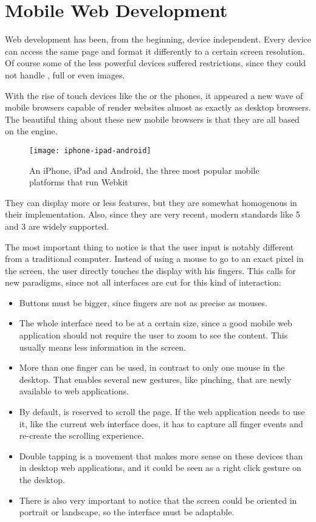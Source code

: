 \section{Mobile Web Development} %
\label{sec:mobile}

Web development has been, from the beginning, device independent.
Every device can access the same page and format it differently to a certain screen resolution.
Of course some of the less powerful devices suffered restrictions, since they could not handle , full  or even images.

With the rise of touch devices like the  or the  phones, it appeared a new wave of mobile browsers capable of render websites almost as exactly as desktop browsers.
The beautiful thing about these new mobile browsers is that they are all based on the  engine.

\begin{figure}[htbp]
  \centering
    \texttt{[image: iphone-ipad-android]}
  \caption[Mobile devices with Webkit]{An iPhone, iPad and Android, the three most popular mobile platforms that run Webkit}
  \label{fig:iphone-ipad-android}
\end{figure}

They can display more or less features, but they are somewhat homogenous in their implementation.
Also, since they are very recent, modern standards like 5 and 3 are widely supported.

The most important thing to notice is that the user input is notably different from a traditional computer.
Instead of using a mouse to go to an exact pixel in the screen, the user directly touches the display with his fingers.
This calls for new paradigms, since not all interfaces are cut for this kind of interaction:

\begin{itemize}
  \item Buttons must be bigger, since fingers are not as precise as mouses.
  \item The whole interface need to be at a certain size, since a good mobile web application should not require the user to zoom to see the content.
  This usually means less information in the screen.
  \item More than one finger can be used, in contrast to only one mouse in the desktop.
  That enables several new gestures, like pinching, that are newly available to web applications.
  \item By default,  is reserved to scroll the page.
  If the web application needs to use it, like the current web interface does, it has to capture all finger events and re-create the scrolling experience.
  \item Double tapping is a movement that makes more sense on these devices than in desktop web applications, and it could be seen as a right click gesture on the desktop.
  \item There is also very important to notice that the screen could be oriented in portrait or landscape, so the interface must be adaptable.
\end{itemize}

